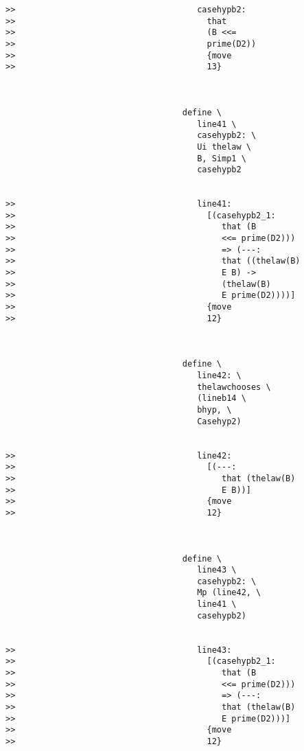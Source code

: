 \documentclass[12pt]{article}
\begin{document}
\begin{verbatim}
>>                                     casehypb2:
>>                                       that
>>                                       (B <<=
>>                                       prime(D2))
>>                                       {move
>>                                       13}



                                    define \
                                       line41 \
                                       casehypb2: \
                                       Ui thelaw \
                                       B, Simp1 \
                                       casehypb2


>>                                     line41:
>>                                       [(casehypb2_1:
>>                                          that (B
>>                                          <<= prime(D2)))
>>                                          => (---:
>>                                          that ((thelaw(B)
>>                                          E B) ->
>>                                          (thelaw(B)
>>                                          E prime(D2))))]
>>                                       {move
>>                                       12}



                                    define \
                                       line42: \
                                       thelawchooses \
                                       (lineb14 \
                                       bhyp, \
                                       Casehyp2)


>>                                     line42:
>>                                       [(---:
>>                                          that (thelaw(B)
>>                                          E B))]
>>                                       {move
>>                                       12}



                                    define \
                                       line43 \
                                       casehypb2: \
                                       Mp (line42, \
                                       line41 \
                                       casehypb2)


>>                                     line43:
>>                                       [(casehypb2_1:
>>                                          that (B
>>                                          <<= prime(D2)))
>>                                          => (---:
>>                                          that (thelaw(B)
>>                                          E prime(D2)))]
>>                                       {move
>>                                       12}




\end{verbatim}
\end{document}
